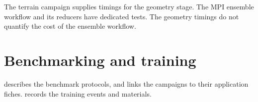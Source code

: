 The terrain campaign supplies timings for the geometry stage. The MPI
ensemble workflow and its reducers have dedicated tests. The geometry
timings do not quantify the cost of the ensemble workflow.

\section{Benchmarking and training}

 describes the benchmark protocols, and
 links the campaigns to their application
fiches.  records the training events and materials.
